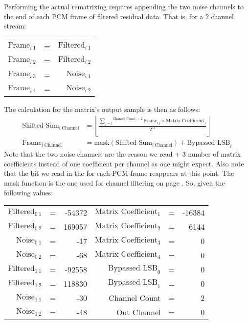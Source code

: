 Performing the actual rematrixing requires appending the two
noise channels to the end of each PCM frame of filtered residual data.
That is, for a 2 channel stream:
\par
\noindent
\begin{tabular}{r c r}
$\text{Frame}_{i~1}$ & = & $\text{Filtered}_{i~1}$ \\
$\text{Frame}_{i~2}$ & = & $\text{Filtered}_{i~2}$ \\
$\text{Frame}_{i~3}$ & = & $\text{Noise}_{i~1}$ \\
$\text{Frame}_{i~4}$ & = & $\text{Noise}_{i~2}$
\end{tabular}
\par
\noindent
The calculation for the matrix's output sample is then as follows:
\begin{align*}
\text{Shifted Sum}_{i~\text{Channel}} &= \left\lfloor\frac{\overset{\text{Channel Count + 2}}{\underset{j = 1}{\sum}}{\text{Frame}_{i~j} \times \text{Matrix Coefficient}_j}}{2 ^ {14}}\right\rfloor \\
\text{Frame}_{i~\text{Channel}} &= \text{mask}(\text{Shifted Sum}_{i~\text{Channel}}) + \text{Bypassed LSB}_i
\end{align*}
Note that the two noise channels are the reason we read
 + 3 number of matrix coefficients
instead of one coefficient per channel as one might expect.
Also note that the  bit we read in the
 for each PCM frame reappears at this point.
The mask function is the one used for channel filtering on page
\pageref{mlp_mask}.
So, given the following values:
\par
\noindent
\begin{tabular}{r c r r c r}
$\text{Filtered}_{0~1}$ & = & -54372 &
$\text{Matrix Coefficient}_1$ & = & -16384 \\
$\text{Filtered}_{0~2}$ & = & 169057 &
$\text{Matrix Coefficient}_2$ & = & 6144 \\
$\text{Noise}_{0~1}$ & = & -17 &
$\text{Matrix Coefficient}_3$ & = & 0 \\
$\text{Noise}_{0~2}$ & = & -68 &
$\text{Matrix Coefficient}_4$ & = & 0 \\
$\text{Filtered}_{1~1}$ & = & -92558 &
$\text{Bypassed LSB}_0$ & = & 0 \\
$\text{Filtered}_{1~2}$ & = & 118830 &
$\text{Bypassed LSB}_1$ & = & 0 \\
$\text{Noise}_{1~1}$ & = & -30 &
Channel Count & = & 2 \\
$\text{Noise}_{1~2}$ & = & -48 &
Out Channel & = & 0
\end{tabular}
